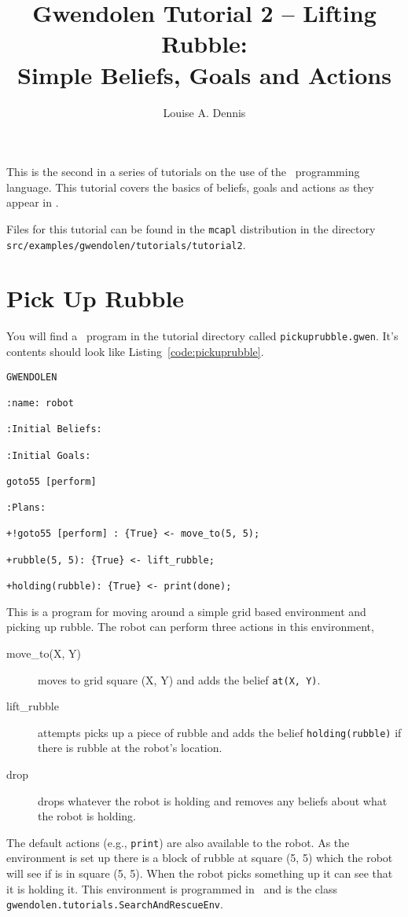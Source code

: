 \documentclass[a4]{article}
\author{Louise A. Dennis}
\title{Gwendolen Tutorial 2 -- Lifting Rubble: \\
Simple Beliefs, Goals and Actions}
\begin{document}
\maketitle
This is the second in a series of tutorials on the use of the \gwendolen\ programming language.  This tutorial covers the basics of beliefs, goals and actions as they appear in \gwendolen.

Files for this tutorial can be found in the \texttt{mcapl} distribution in the directory \texttt{src/examples/gwendolen/tutorials/tutorial2}.

\section{Pick Up Rubble}

You will find a \gwendolen\ program in the tutorial directory called \texttt{pickuprubble.gwen}.  It's contents should look like Listing~\ref{code:pickuprubble}.
\begin{lstlisting}[float,caption=Pick Up Rubble,basicstyle=\sffamily,style=easslisting,language=Gwendolen,label=code:pickuprubble]
GWENDOLEN

:name: robot

:Initial Beliefs:

:Initial Goals:

goto55 [perform]

:Plans:

+!goto55 [perform] : {True} <- move_to(5, 5);

+rubble(5, 5): {True} <- lift_rubble;

+holding(rubble): {True} <- print(done);
\end{lstlisting}
This is a program for moving around a simple grid based environment and picking up rubble.  The robot can perform three actions in this environment, 
\begin{description}
\item[move\_to(X, Y)] moves to grid square (X, Y) and adds the belief \lstinline{at(X, Y)}.
\item[lift\_rubble] attempts picks up a piece of rubble and adds the belief \lstinline{holding(rubble)} if there is rubble at the robot's location.
\item[drop] drops whatever the robot is holding and removes any beliefs about what the robot is holding.
\end{description}
The default actions (e.g., \lstinline{print}) are also available to the robot.  As the environment is set up there is a block of rubble at square (5, 5) which the robot will see if is in square (5, 5).  When the robot picks something  up it can see that it is holding it.  This environment is programmed in \java\ and is the class \lstinline{gwendolen.tutorials.SearchAndRescueEnv}.
\end{document}
